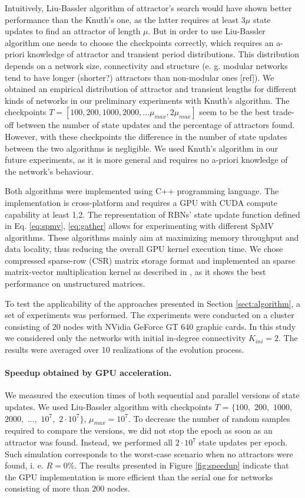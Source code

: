 \documentclass[procedia]{easychair}
\begin{document}
	Intuitively, Liu-Bassler algorithm of attractor's search would have shown better performance than the Knuth's one, as the latter requires at least $3 \mu$ state updates to find an attractor of length $\mu$. But in order to use Liu-Bassler algorithm one needs to choose the checkpoints correctly, which requires an a-priori knowledge of attractor and transient period distributions. This distribution depends on a network size, connectivity and structure (e. g. modular networks tend to have longer (shorter?) attractors than non-modular ones [ref]). We obtained an empirical distribution of attractor and transient lengths for different kinds of networks in our preliminary experiments with Knuth's algorithm. The checkpoints $T=[100, 200, 1000, 2000, ... \mu_{max}, 2 \mu_{max}]$ seem to be the best trade-off between the number of state updates and the percentage of attractors found. However, with these checkpoints the difference in the number of state updates between the two algorithms is negligible. We used Knuth's algorithm in our future experiments, as it is more general and requires no a-priori knowledge of the network's behaviour.
	
	Both algorithms were implemented using C++ programming language. The implementation is cross-platform and requires a GPU with CUDA compute capability at least 1.2. The representation of RBNs' state update function defined in Eq. \ref{eq:spmv}, \ref{eq:gather} allows for experimenting with different SpMV algorithms. These algorithms mainly aim at maximizing memory throughput and data locality, thus reducing the overall GPU kernel execution time. We chose compressed sparse-row (CSR) matrix storage format and implemented an sparse matrix-vector multiplication kernel as described in \cite{bell2008efficient}, as it shows the best performance on unstructured matrices.
	
	To test the applicability of the approaches presented in Section \ref{sect:algorithm}, a set of experiments was performed. The experiments were conducted on a cluster consisting of 20 nodes with NVidia GeForce GT 640 graphic cards. In this study we considered only the networks with initial in-degree connectivity $K_{ini}=2$. The results were averaged over 10 realizations of the evolution process.
	
	\paragraph{Speedup obtained by GPU acceleration.} We measured the execution times of both sequential and parallel versions of state updates. We used Liu-Bassler algorithm with checkpoints $T$ = $\{100,$ $200,$ $1000,$ $2000,$ $...,$ $10^7,$ $2 \cdot 10^7\}$, $\mu_{max} = 10^7$. To decrease the number of random samples required to compare the versions, we did not stop the epoch as soon as an attractor was found. Instead, we performed all $2 \cdot 10^7$ state updates per epoch. Such simulation corresponds to the worst-case scenario when no attractors were found, i. e. $R = 0\%$. The results presented in Figure \ref{fig:speedup} indicate that the GPU implementation is more efficient than the serial one for networks consisting of more than $200$ nodes.
	
\end{document}
